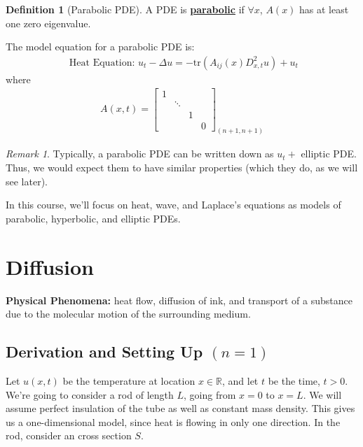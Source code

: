 \documentclass[11pt]{scrartcl}
\theoremstyle{definition}
\newtheorem{definition}{Definition}
\theoremstyle{remark}
\newtheorem{remark}{Remark}
\newcommand{\dfn}[1]{\textbf{\underline{#1}}}
\newcommand{\R}[0]{\mathbb{R}}
\begin{document}
\begin{definition}[Parabolic PDE]
	A PDE is \dfn{parabolic} if $\forall x$, $A(x)$ has at least one zero eigenvalue. 
\end{definition}

The model equation for a parabolic PDE is: 
\begin{align}
	\text{ Heat Equation: } u_t - \Delta u = - \text{tr}(A_{ij}(x) D_{x,t}^2 u) + u_t 	
\end{align}
where 
\begin{align}
	A(x,t) = 	\begin{bmatrix}
		1 &  &  & \\
		  & \ddots & & \\
		  &  &  1 & \\
		  & & & 0
	\end{bmatrix}_{(n+1, n+1)}	
\end{align}

\begin{remark}
	Typically, a parabolic PDE can be written down as $u_t + $ elliptic PDE. Thus, we would expect them to have similar properties (which they do, as we will see later). 
\end{remark}
In this course, we'll focus on heat, wave, and Laplace's equations as models of parabolic, hyperbolic, and elliptic PDEs. 

\section{Diffusion}
\textbf{Physical Phenomena:} heat flow, diffusion of ink, and transport of a substance due to the molecular motion of the surrounding medium. 

\subsection{Derivation and Setting Up $(n=1)$}
Let $u(x,t)$ be the temperature at location $x \in \R$, and let $t$ be the time, $t > 0$. We're going to consider a rod of length $L$, going from $x=0$ to $x=L$. We will assume perfect insulation of the tube as well as constant mass density. This gives us a one-dimensional model, since heat is flowing in only one direction. In the rod, consider an cross section $S$.   
\end{document}
